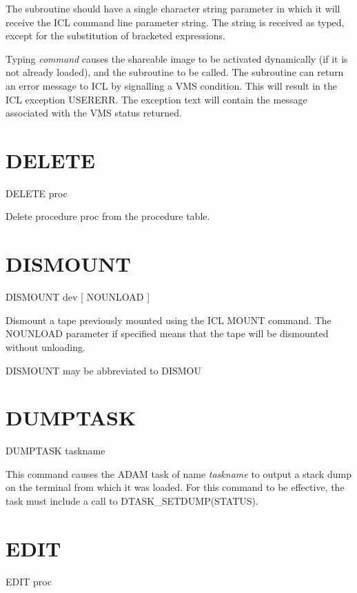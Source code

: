  The subroutine should have a single character string parameter in which it
 will receive the ICL command line parameter string. The string is received as  
 typed, except for the substitution of bracketed expressions.

 Typing {\em command} causes the shareable image to be activated dynamically
 (if it is not already loaded), and the subroutine to be called. The 
 subroutine can return an error message to ICL by signalling a VMS condition.
 This will result in the ICL exception USERERR. The exception text will
 contain the message associated with the VMS status returned.

\section{DELETE}

   DELETE \hspace{.5cm} proc

 Delete procedure proc from the procedure table.

\section{DISMOUNT}

   DISMOUNT \hspace{.5cm} dev \hspace{.5cm} [ NOUNLOAD ]

 Dismount a tape previously mounted using the ICL MOUNT command. The
 NOUNLOAD parameter if specified means that the tape will be dismounted
 without unloading.

 DISMOUNT may be abbreviated to DISMOU

\section{DUMPTASK}

   DUMPTASK \hspace{.5cm}  taskname

This command causes the ADAM task of name {\em taskname} to output a
stack dump on the terminal from which it was loaded. For this command
to be effective, the task must include a call to DTASK\_SETDUMP(STATUS).

\section{EDIT}

   EDIT \hspace{.5cm} proc


